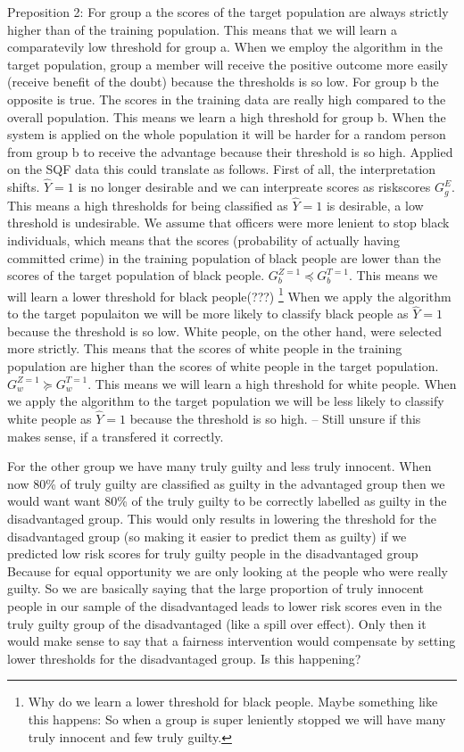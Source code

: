 Preposition 2:
For group a the scores of the target population are always strictly higher than
of the training population. This means that we will learn a comparatevily low threshold for group a.
When we employ the algorithm in the target population, group a member will receive the positive outcome
 more easily (receive benefit of the doubt) because the thresholds is so low. For group b
 the opposite is true. The scores in the training data are really high compared to the overall population.
 This means we learn a high threshold for group b. When the system is applied on the whole population it will
 be harder for a random person from group b to receive the advantage because their threshold is so high.
Applied on the SQF data this could translate as follows. First of all, the interpretation shifts. $\hat{Y} = 1$ is 
no longer desirable and we can interpreate scores as riskscores $G_g^{E}$. This means a high thresholds for being classified as $\hat{Y} = 1$ is desirable, a low
threshold is undesirable. We assume that officers were more lenient to stop black individuals, which means that the scores (probability of actually having committed crime) in the training population
of black people are lower than the scores of the target population of black people.
$G_b^{Z=1} \preceq G_b^{T=1}$. This means we will learn a lower threshold for black people(???) \footnote{Why do we learn a lower threshold for black people. Maybe something like this happens: So when a group is super leniently stopped we will have many truly innocent and few truly guilty.}
When we apply the algorithm to the target populaiton we will be more likely to classify black people as $\hat{Y} = 1$ because the threshold is so low. White people, on the other hand,
were selected more strictly. This means that the scores of white people in the training population are higher than the scores of white people in the target population.
$G_w^{Z=1} \succeq G_w^{T=1}$. This means we will learn a high threshold for white people. When we apply the algorithm to the target population we will be less likely to classify white
people as $\hat{Y} = 1$ because the threshold is so high. -- Still unsure if this makes sense, if a transfered it correctly.

For the other group we have many truly guilty and less truly innocent. When now 80\% of truly guilty are classified as guilty in the advantaged group then we would want want 80\% of
the truly guilty to be correctly labelled as guilty in the disadvantaged group. This would only results in lowering the threshold for the disadvantaged group
(so making it easier to predict them as guilty) if we predicted low risk scores for truly guilty people in the disadvantaged group
 Because for equal opportunity we are only looking at the people who were really guilty. So we are basically saying that the large proportion of truly
 innocent people in our sample of the disadvantaged leads to lower risk scores even in the truly guilty group of the disadvantaged (like a spill over effect).
 Only then it would make sense to say that a fairness intervention would compensate by setting lower thresholds for the disadvantaged group. Is this happening? 

